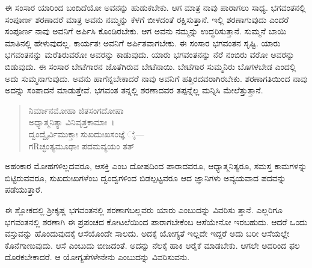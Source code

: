 ಈ ಸಂಸಾರ ಯಾರಿಂದ ಬಂದಿದೆಯೋ ಅವನನ್ನು ಹುಡುಕಬೇಕು. ಆಗ ಮಾತ್ರ ನಾವು ಪಾರಾಗಲು ಸಾಧ್ಯ. ಭಗವಂತನಲ್ಲಿ ಸಂಪೂರ್ಣ ಶರಣಾದರೆ ಮಾತ್ರ ಅವನು ನಮ್ಮನ್ನು ಕೆಳಗೆ ಬೀಳದಂತೆ ರಕ್ಷಿಸುತ್ತಾನೆ. ಇಲ್ಲಿ ಶರಣಾಗುವುದು ಎಂದರೆ ಸಂಪೂರ್ಣ ನಾವು ಅವನಿಗೆ ಅರ್ಪಿಸಿ ಕೊಂಡಿರಬೇಕು. ಆಗ ಅವನು ನಮ್ಮನ್ನು ಉದ್ಧರಿಸುತ್ತಾನೆ. ಸುಮ್ಮನೆ ಬಾಯಿ ಮಾತಿನಲ್ಲಿ ಹೇಳುವುದಲ್ಲ. ಕಾರ್ಯತಃ ಅವನಿಗೆ ಅರ್ಪಿತವಾಗಬೇಕು. ಈ ಸಂಸಾರ ಭಗವಂತನ ಸೃಷ್ಟಿ. ಯಾರು ಭಗವಂತನನ್ನು ಮರೆತಿರುವರೋ ಅವರನ್ನು ಕಾಡುವುದು. ಯಾರು ಭಗವಂತನನ್ನು ನೆರೆ ನಂಬಿರು ವರೋ ಅವರನ್ನು ಬಿಡುವುದು. ಈ ಸಂಸಾರ ಬೇಟೆಗಾರನ ಜೊತೆಗಿರುವ ಬೇಟೆನಾಯಿ. ಬೇಟೆಗಾರ ಸುಮ್ಮನಿರು ಬೊಗಳಬೇಡ ಎಂದಲ್ಲಿ ಅದು ಸುಮ್ಮನಾಗುವುದು. ಅವನು ಹಾಗೆನ್ನಬೇಕಾದರೆ ನಾವು ಅವನಿಗೆ ಹತ್ತಿರದವರಾಗಿರಬೇಕು. ಶರಣಾಗತಿಯಿಂದ ನಾವು ಅದನ್ನು ಸಂಪಾದನೆ ಮಾಡುತ್ತೇವೆ. ಭಗವಂತ ತನ್ನಲ್ಲಿ ಶರಣಾದವರ ತಪ್ಪನ್ನೆಲ್ಲ ಮನ್ನಿಸಿ ಮೇಲೆತ್ತುತ್ತಾನೆ.

\begin{verse}
ನಿರ್ಮಾನಮೋಹಾ ಜಿತಸಂಗದೋಷಾ \\ ಅಧ್ಯಾತ್ಮನಿತ್ಯಾ ವಿನಿವೃತ್ತಕಾಮಾಃ~।\\ದ್ವಂದ್ವೈರ್ವಿಮುಕ್ತಾಃ ಸುಖದುಃಖಸಂಜ್ಞೆ ೈ—\\ ಗRಚ್ಛಂತ್ಯಮೂಢಾಃ ಪದಮವ್ಯಯಂ ತತ್ 
\end{verse}

{\small ಅಹಂಕಾರ ಮೋಹಗಳಿಲ್ಲದವರೂ, ಆಸಕ್ತಿ ಎಂಬ ದೋಷದಿಂದ ಪಾರಾದವರೂ, ಆಧ್ಯಾತ್ಮನಿತ್ಯರೂ, ಸಮಸ್ತ ಕಾಮಗಳನ್ನು ಬಿಟ್ಟಿರುವವರೂ, ಸುಖದುಃಖಗಳೆಂಬ ದ್ವಂದ್ವಗಳಿಂದ ಬಿಡಲ್ಪಟ್ಟವರೂ ಆದ ಜ್ಞಾನಿಗಳು ಅವ್ಯಯವಾದ ಪದವನ್ನು ಪಡೆಯುತ್ತಾರೆ.}

ಈ ಶ್ಲೋಕದಲ್ಲಿ ಶ‍್ರೀಕೃಷ್ಣ ಭಗವಂತನಲ್ಲಿ ಶರಣಾಗಬಲ್ಲವರು ಯಾರು ಎಂಬುದನ್ನು ವಿವರಿಸು ತ್ತಾನೆ. ಎಲ್ಲರಿಗೂ ಭಗವಂತನಲ್ಲಿ ಶರಣಾಗಿ ಈ ಪ್ರಪಂಚದ ಕೋಟಲೆಯಿಂದ ಪಾರಾಗಬೇಕೆಂಬ ಆಸೆಯೇನೋ ಇರಬಹುದು. ಆದರೆ ಒಂದು ವಸ್ತುವನ್ನು ಹೊಂದುವುದಕ್ಕೆ ಆಸೆಯೊಂದೇ ಸಾಲದು. ಅದಕ್ಕೆ ಯೋಗ್ಯತೆ ಇಲ್ಲದೇ ಇದ್ದರೆ ಅದು ಬರೀ ಆಸೆಯಲ್ಲೇ ಕೊನೆಗಾಣುವುದು. ಆಸೆ ಎಂಬುದು ಬೀಜದಂತೆ. ಅದನ್ನು ನೆಲಕ್ಕೆ ಹಾಕಿ ಆರೈಕೆ ಮಾಡಬೇಕು. ಆಗಲೇ ಅದರಿಂದ ಫಲ ದೊರಕಬೇಕಾದರೆ. ಆ ಯೋಗ್ಯತೆಗಳೇನೇನು ಎಂಬುದನ್ನು ವಿವರಿಸುವನು.

